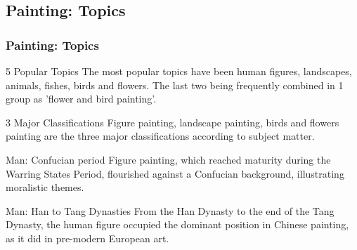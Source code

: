 \documentclass[pdflatex,compress,8pt,
	xcolor={dvipsnames,dvipsnames,svgnames,x11names,table},
	hyperref={	
	breaklinks = true, 
	pdfauthor={Lemenkova Polina}, 
	pdfsubject={Preentation}, 
	pdfcreator={Lemenkova Polina}, 
	pdfproducer={Lemenkova Polina}, 
	colorlinks=true,
	linkcolor=NavyBlue, 
	citecolor=NavyBlue, 
	urlcolor = NavyBlue, 
	breaklinks = true}]{beamer}
\begin{document}
\subsection{Painting: Topics}
\begin{frame}\frametitle{Painting: Topics}

	\begin{alertblock}{5 Popular Topics}
	The most popular topics have been human figures, landscapes, animals, fishes, birds and flowers. The last two being frequently combined in 1 group as 'flower and bird painting'.
	\end{alertblock}

	\begin{block}{3 Major Classifications}
	Figure painting, landscape painting, birds and flowers painting are the three major classifications according to subject matter.
	\end{block}

	\begin{alertblock}{Man: Confucian period}
	Figure painting, which reached maturity during the Warring States Period, flourished against a Confucian background, illustrating moralistic themes.
	\end{alertblock}
	
	\begin{block}{Man:  Han to Tang Dynasties}
	From the Han Dynasty to the end of the Tang Dynasty, the human figure occupied the dominant position in Chinese painting, as it did in pre-modern European art.
	\end{block}
	
\end{frame}
\end{document}
